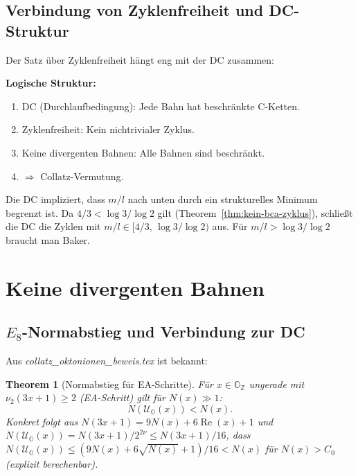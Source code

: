 \documentclass[12pt,a4paper]{article}
\newtheorem{theorem}[definition]{Theorem}
\newcommand{\vii}{\nu_2}
\newcommand{\Z}{\mathbb{Z}}
\begin{document}
\subsection{Verbindung von Zyklenfreiheit und DC-Struktur}

Der Satz über Zyklenfreiheit hängt eng mit der DC zusammen:

\begin{tcolorbox}[kernidee]
\textbf{Logische Struktur:}
\begin{enumerate}[label=(\arabic*)]
  \item DC (Durchlaufbedingung): Jede Bahn hat beschränkte C-Ketten.
  \item Zyklenfreiheit: Kein nichtrivialer Zyklus.
  \item Keine divergenten Bahnen: Alle Bahnen sind beschränkt.
  \item[(1)+(2)+(3)] $\Rightarrow$ Collatz-Vermutung.
\end{enumerate}
Die DC impliziert, dass $m/l$ nach unten durch ein strukturelles Minimum
begrenzt ist. Da $4/3 < \log3/\log2$ gilt (Theorem~\ref{thm:kein-bca-zyklus}),
schließt die DC die Zyklen mit $m/l \in [4/3,\,\log3/\log2)$ aus.
Für $m/l > \log3/\log2$ braucht man Baker.
\end{tcolorbox}

\section{Keine divergenten Bahnen}
\label{sec:divergenz}

\subsection{$E_8$-Normabstieg und Verbindung zur DC}

Aus \textit{collatz\_oktonionen\_beweis.tex} ist bekannt:

\begin{theorem}[Normabstieg für EA-Schritte]
Für $x \in \mathbb{O}_{\Z}$ ungerade mit $\vii(3x+1) \geq 2$ (EA-Schritt)
gilt für $N(x) \gg 1$:
\[
  N(\mathcal{U}_{\mathbb{O}}(x)) < N(x).
\]
Konkret folgt aus $N(3x+1) = 9N(x) + 6\operatorname{Re}(x) + 1$ und
$N(\mathcal{U}_{\mathbb{O}}(x)) = N(3x+1)/2^{2\nu} \leq N(3x+1)/16$,
dass $N(\mathcal{U}_{\mathbb{O}}(x)) \leq (9N(x) + 6\sqrt{N(x)} + 1)/16 < N(x)$
für $N(x) > C_0$ (explizit berechenbar).
\end{theorem}
\end{document}
